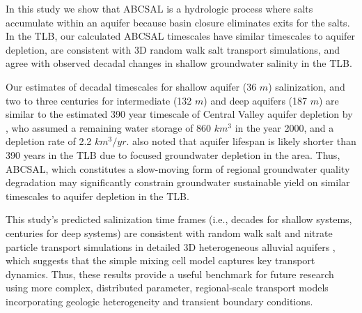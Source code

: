 In this study we show that ABCSAL is a hydrologic process where salts accumulate within an aquifer because basin closure eliminates exits for the salts. In the TLB, our calculated ABCSAL timescales have similar timescales to aquifer depletion, are consistent with 3D random walk salt transport simulations, and agree with observed decadal changes in shallow groundwater salinity in the TLB.

Our estimates of decadal timescales for shallow aquifer (36 $m$) salinization, and two to three centuries for intermediate (132 $m$) and deep aquifers (187 $m$) are similar to the estimated 390 year timescale of Central Valley aquifer depletion by \cite{Scanlon2012}, who %
assumed a remaining water storage of 860 $km^3$ in the year 2000, and a depletion rate of 2.2 $km^3/yr$. \cite{Scanlon2012} also noted that aquifer lifespan is likely shorter than 390 years in the TLB due to focused groundwater depletion in the area. Thus, ABCSAL, which constitutes a slow-moving form of regional groundwater quality degradation may significantly constrain groundwater sustainable yield on similar timescales to aquifer depletion in the TLB. 

This study's predicted salinization time frames (i.e., decades for shallow systems, centuries for deep systems) are consistent with random walk salt and nitrate particle transport simulations in detailed 3D heterogeneous alluvial aquifers \citep{henri2019, zhang2006nonpoint}, which suggests that the simple mixing cell model captures key transport dynamics. Thus, these results provide a useful benchmark for future research using more complex, distributed parameter, regional-scale transport models incorporating geologic heterogeneity and transient boundary conditions.

